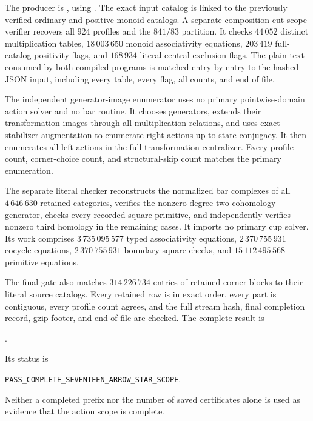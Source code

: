 \begin{remark}
\label{C:seventeen-stars-verification}
The producer is , using
. The exact input catalog
is linked to the previously verified ordinary and positive
monoid catalogs. A separate composition-cut scope verifier
recovers all $924$ profiles and the $841/83$ partition. It checks
$44\,052$ distinct multiplication tables, $18\,003\,650$
monoid associativity equations, $203\,419$ full-catalog positivity
flags, and $168\,934$ literal central exclusion flags.
The plain text consumed by both compiled programs is matched
entry by entry to the hashed JSON input, including every table,
every flag, all counts, and end of file.

The independent generator-image enumerator
 uses no primary
pointwise-domain action solver and no bar routine. It chooses
generators, extends their transformation images through all
multiplication relations, and uses exact stabilizer augmentation
to enumerate right actions up to state conjugacy. It then
enumerates all left actions in the full transformation
centralizer. Every profile count, corner-choice count, and
structural-skip count matches the primary enumeration.

The separate literal checker
reconstructs the normalized bar complexes of all
$4\,646\,630$ retained categories, verifies the nonzero
degree-two cohomology generator, checks every recorded square
primitive, and independently verifies nonzero third homology
in the remaining cases. It imports no primary cup solver.
Its work comprises $3\,735\,095\,577$ typed associativity equations,
$2\,370\,755\,931$ cocycle equations, $2\,370\,755\,931$ boundary-square
checks, and $15\,112\,495\,568$ primitive equations.

The final gate also matches $314\,226\,734$ entries of retained
corner blocks to their literal source catalogs. Every retained
row is in exact order, every part is contiguous, every profile
count agrees, and the full stream hash, final completion record,
gzip footer, and end of file are checked. The complete result is
\begin{center}
.
\end{center}
Its status is
\begin{center}\texttt{PASS\_COMPLETE\_SEVENTEEN\_ARROW\_STAR\_SCOPE}.
\end{center}
Neither a completed prefix nor the number of saved certificates
alone is used as evidence that the action scope is complete.
\end{remark}
